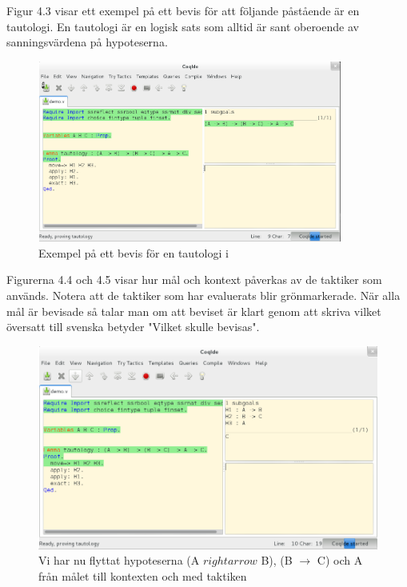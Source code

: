 Figur 4.3 visar ett exempel på ett bevis för att följande påstående är en
tautologi. En tautologi är en logisk sats som alltid är sant oberoende av
sanningsvärdena på hypoteserna.


\begin{figure}[H]
  \centering
  \includegraphics[width=100mm]{images/Proof_part1}
  \caption[Exempel på bevis i \coq]
   {Exempel på ett bevis för en tautologi i \coq}
\end{figure}

Figurerna 4.4 och 4.5 visar hur mål och kontext påverkas av de taktiker som
används.
Notera att de taktiker som har evaluerats blir grönmarkerade.
När alla mål är bevisade så talar man om att beviset är klart genom att skriva
 vilket översatt till svenska betyder "Vilket skulle bevisas".


\begin{figure}[H]
  \centering
  \includegraphics[width=150mm]{images/Proof_part2}
  \caption[Bevis i \coq Ide]
   {Vi har nu flyttat hypoteserna (A $rightarrow$ B), (B $\rightarrow$ C) och A
    från målet till kontexten och med taktiken }
\end{figure}

